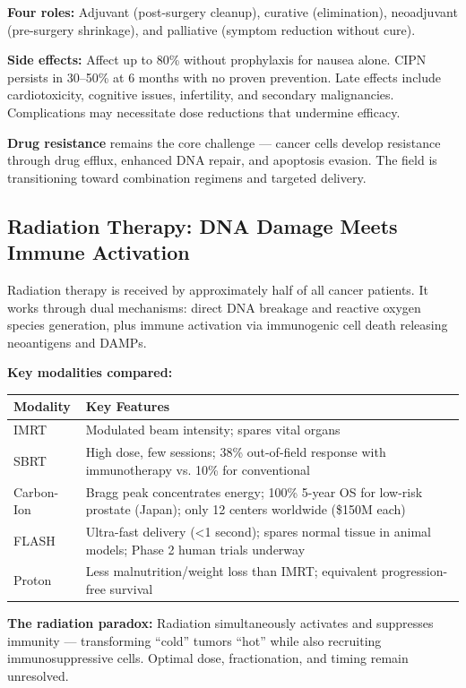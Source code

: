 \textbf{Four roles:} Adjuvant (post-surgery cleanup), curative
(elimination), neoadjuvant (pre-surgery shrinkage), and palliative
(symptom reduction without cure).

\textbf{Side effects:} Affect up to 80\% without prophylaxis for nausea
alone. CIPN persists in 30--50\% at 6 months with no proven prevention.
Late effects include cardiotoxicity, cognitive issues, infertility, and
secondary malignancies. Complications may necessitate dose reductions
that undermine efficacy.

\textbf{Drug resistance} remains the core challenge --- cancer cells
develop resistance through drug efflux, enhanced DNA repair, and
apoptosis evasion. The field is transitioning toward combination
regimens and targeted delivery.

\subsection{Radiation Therapy: DNA Damage Meets Immune
Activation}\label{radiation-therapy-dna-damage-meets-immune-activation}

Radiation therapy is received by approximately half of all cancer
patients. It works through dual mechanisms: direct DNA breakage and
reactive oxygen species generation, plus immune activation via
immunogenic cell death releasing neoantigens and DAMPs.

\textbf{Key modalities compared:}

\begin{longtable}{p{3.5cm}p{10cm}}
\toprule
\textbf{Modality} & \textbf{Key Features} \\
\midrule
IMRT & Modulated beam intensity; spares vital organs \\
SBRT & High dose, few sessions; 38\% out-of-field response with immunotherapy vs. 10\% for conventional \\
Carbon-Ion & Bragg peak concentrates energy; 100\% 5-year OS for low-risk prostate (Japan); only 12 centers worldwide (\$150M each) \\
FLASH & Ultra-fast delivery (<1 second); spares normal tissue in animal models; Phase 2 human trials underway \\
Proton & Less malnutrition/weight loss than IMRT; equivalent progression-free survival \\
\bottomrule
\end{longtable}

\textbf{The radiation paradox:} Radiation simultaneously activates and
suppresses immunity --- transforming ``cold'' tumors ``hot'' while also
recruiting immunosuppressive cells. Optimal dose, fractionation, and
timing remain unresolved.

